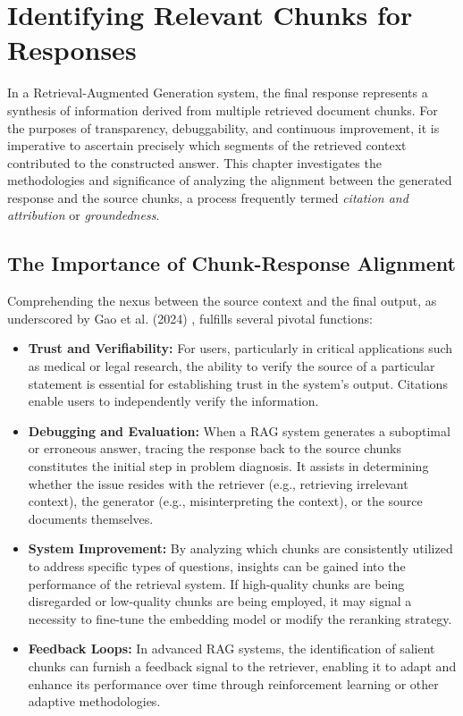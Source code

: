 \chapter{Identifying Relevant Chunks for Responses}
\label{chap:relevant_chunks}

In a Retrieval-Augmented Generation system, the final response represents a synthesis of information derived from multiple retrieved document chunks. For the purposes of transparency, debuggability, and continuous improvement, it is imperative to ascertain precisely which segments of the retrieved context contributed to the constructed answer. This chapter investigates the methodologies and significance of analyzing the alignment between the generated response and the source chunks, a process frequently termed \textit{citation and attribution} or \textit{groundedness}.

\section{The Importance of Chunk-Response Alignment}
Comprehending the nexus between the source context and the final output, as underscored by Gao et al. (2024) \autocite{gao2024retrievalaugmentedgenerationlargelanguage}, fulfills several pivotal functions:
\begin{itemize}
    \item \textbf{Trust and Verifiability:} For users, particularly in critical applications such as medical or legal research, the ability to verify the source of a particular statement is essential for establishing trust in the system's output. Citations enable users to independently verify the information.
    \item \textbf{Debugging and Evaluation:} When a RAG system generates a suboptimal or erroneous answer, tracing the response back to the source chunks constitutes the initial step in problem diagnosis. It assists in determining whether the issue resides with the retriever (e.g., retrieving irrelevant context), the generator (e.g., misinterpreting the context), or the source documents themselves.
    \item \textbf{System Improvement:} By analyzing which chunks are consistently utilized to address specific types of questions, insights can be gained into the performance of the retrieval system. If high-quality chunks are being disregarded or low-quality chunks are being employed, it may signal a necessity to fine-tune the embedding model or modify the reranking strategy.
    \item \textbf{Feedback Loops:} In advanced RAG systems, the identification of salient chunks can furnish a feedback signal to the retriever, enabling it to adapt and enhance its performance over time through reinforcement learning or other adaptive methodologies.
\end{itemize}


